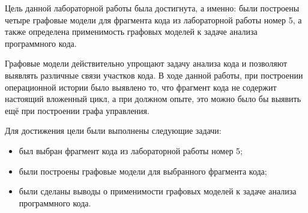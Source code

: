 
Цель данной лабораторной работы была достигнута, а именно: были построены четыре графовые модели для фрагмента кода из лабораторной работы номер 5, а также определена применимость графовых моделей к задаче анализа программного кода.

Графовые модели действительно упрощают задачу анализа кода и позволяют выявлять различные связи участков кода. В ходе данной работы, при построении операционной истории было выявлено то, что фрагмент кода не содержит настоящий вложенный цикл, а при должном опыте, это можно было бы выявить ещё при построении графа управления.

Для достижения цели были выполнены следующие задачи:
\begin{itemize}
  \item был выбран фрагмент кода из лабораторной работы номер 5;
  \item были построены графовые модели для выбранного фрагмента кода;
  \item были сделаны выводы о применимости графовых моделей к задаче анализа программного кода.
\end{itemize}
